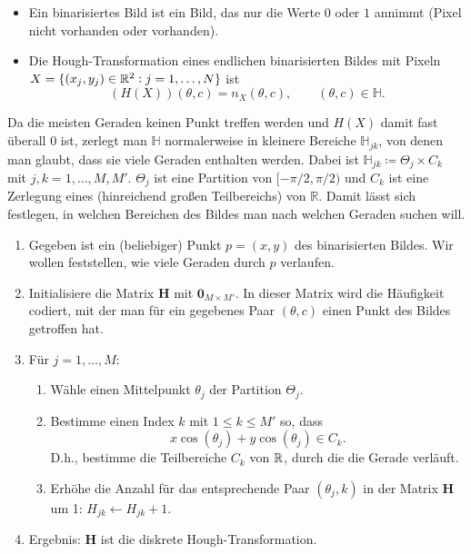 \begin{definition} \leavevmode
\begin{itemize}
\item Ein binarisiertes Bild ist ein Bild, das nur die Werte $ 0 $ oder $ 1 $ annimmt (Pixel nicht
  vorhanden oder vorhanden).
\item Die Hough-Transformation eines endlichen binarisierten Bildes mit Pixeln
  $ X = \{ (x_{j}, y_{j}) \in \mathbb{R}^{2} : j = 1, \ldots, N \} $ ist
  \[
    (H(X))(\theta, c) = n_{X}(\theta, c), \qquad (\theta, c) \in \mathbb{H}.
  \]
\end{itemize}
\end{definition}

Da die meisten Geraden keinen Punkt treffen werden und $ H(X) $ damit fast überall $ 0 $ ist,
zerlegt man $ \mathbb{H} $ normalerweise in kleinere Bereiche $ \mathbb{H}_{jk} $, von denen man
glaubt, dass sie viele Geraden enthalten werden. Dabei ist
$ \mathbb{H}_{jk} \coloneqq \Theta_{j} \times C_{k} $ mit $ j,k = 1, \ldots, M, M' $. $ \Theta_{j} $
ist eine Partition von $ [-\pi / 2, \pi / 2) $ und $ C_{k} $ ist eine Zerlegung eines (hinreichend
großen Teilbereichs) von $ \mathbb{R} $. Damit lässt sich festlegen, in welchen Bereichen des Bildes
man nach welchen Geraden suchen will.

\begin{remark} \leavevmode
\begin{enumerate}
\item Gegeben ist ein (beliebiger) Punkt $ p = (x,y) $ des binarisierten Bildes. Wir wollen 
  feststellen, wie viele Geraden durch $ p $ verlaufen.
\item Initialisiere die Matrix $ \mathbf{H} $ mit $ \mathbf{0}_{M \times M'} $. In dieser Matrix
  wird die Häufigkeit codiert, mit der man für ein gegebenes Paar $ (\theta, c) $ einen Punkt
  des Bildes getroffen hat.
\item Für $ j = 1, \ldots, M $:
  \begin{enumerate}
  \item Wähle einen Mittelpunkt $ \theta_{j} $ der Partition $ \Theta_{j} $.
  \item Bestimme einen Index $ k $ mit $ 1 \leq k \leq M' $ so, dass
    \[
      x \cos(\theta_{j}) + y \cos(\theta_{j}) \in C_{k}.
    \]
    D.h., bestimme die Teilbereiche $ C_{k} $ von $ \mathbb{R} $, durch die die Gerade verläuft.
  \item Erhöhe die Anzahl für das entsprechende Paar $ (\theta_{j}, k) $ in der Matrix
  $ \mathbf{H} $ um 1: $ H_{jk} \leftarrow H_{jk} + 1 $.
  \end{enumerate}
\item Ergebnis: $ \mathbf{H} $ ist die diskrete Hough-Transformation.
\end{enumerate}
\end{remark}

